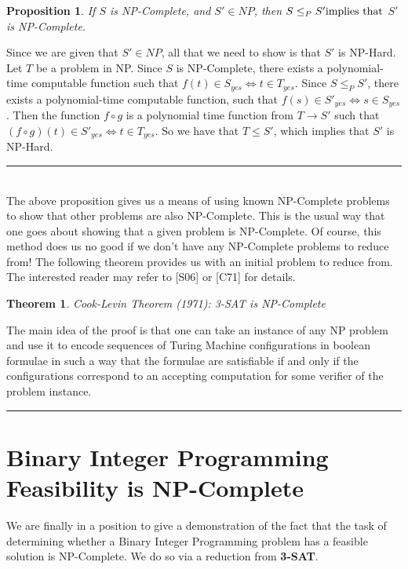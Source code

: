 \documentclass{article}
\newtheorem{theorem}{Theorem}[section]
\newtheorem{proposition}{Proposition}[section]
\renewcommand{\cite}[1]{[#1]}
\renewcommand{\cite}[1]{[#1]}
\newenvironment{proofsketch}{{\bf Proof Sketch:}}{\hfill\rule{2mm}{2mm}}
\newenvironment{proof}{{\bf Proof:}}{\hfill\rule{2mm}{2mm}}
\begin{document}
\begin{proposition}{If $S$ is NP-Complete, and $S' \in NP$, then
    $S \leq_P S' \textnormal{implies that}$ $S'$ is NP-Complete.}
\end{proposition}
\begin{proof}
  Since we are given that $S' \in NP$, all that we need to show is
  that $S'$ is NP-Hard.  Let $T$ be a problem in NP.  Since $S$ is
  NP-Complete, there exists a polynomial-time computable function
   such that $f(t) \in S_{yes} \Leftrightarrow t
  \in T_{yes}$. Since $S \leq_P S'$, there exists a
  polynomial-time computable function,  such
  that $f(s) \in S'_{yes} \Leftrightarrow s \in S_{yes}$.  Then
  the function $f \circ g$ is a polynomial time function from $T
  \rightarrow S'$ such that $(f \circ g)(t) \in S'_{yes}
  \Leftrightarrow t \in T_{yes}$.  So we have that $T \leq S'$,
  which implies that $S'$ is NP-Hard.
\end{proof}\\

The above proposition gives us a means of using known NP-Complete
problems to show that other problems are also NP-Complete.  This is
the usual way that one goes about showing that a given problem is
NP-Complete.  Of course, this method does us no good if we don't have
any NP-Complete problems to reduce from!  The following theorem
provides us with an initial problem to reduce from.  The interested
reader may refer to \cite{S06} or \cite{C71} for details.

\begin{theorem}{Cook-Levin Theorem (1971)}: 3-SAT is NP-Complete
\end{theorem}
\begin{proofsketch}
  The main idea of the proof is that one can take an instance of any
  NP problem and use it to encode sequences of Turing Machine
  configurations in boolean formulae in such a way that the formulae
  are satisfiable if and only if the configurations correspond to an
  accepting computation for some verifier of the problem instance.
\end{proofsketch}

\section{Binary Integer Programming Feasibility is NP-Complete}

We are finally in a position to give a demonstration of the fact
that the task of determining whether a Binary Integer Programming
problem has a feasible solution is NP-Complete. We do so via a
reduction from \textbf{3-SAT}.
\end{document}
